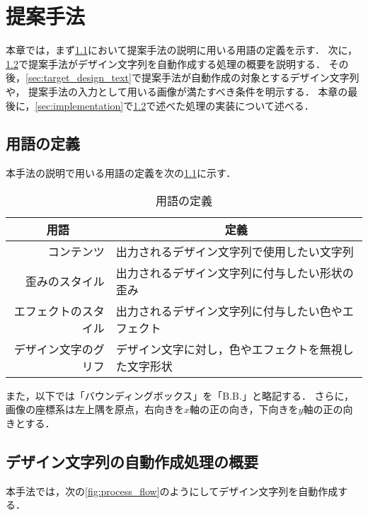 \documentclass[\homedir/main.tex]{subfiles}
\begin{document}
\setcounter{chapter}{3}
\chapter{提案手法}\label{chap:methods}
本章では，まず\cref{sec:terms_definition}において提案手法の説明に用いる用語の定義を示す．
次に，\cref{sec:process_flow}で提案手法がデザイン文字列を自動作成する処理の概要を説明する．
その後，\cref{sec:target_design_text}で提案手法が自動作成の対象とするデザイン文字列や，
提案手法の入力として用いる画像が満たすべき条件を明示する．
本章の最後に，\cref{sec:implementation}で\cref{sec:process_flow}で述べた処理の実装について述べる．

\section{用語の定義}\label{sec:terms_definition}
本手法の説明で用いる用語の定義を次の\cref{tab:terms_definition}に示す．

\begin{table}[h]
    \centering
    \caption{用語の定義}
    \begin{tabular}[t]{rl}
        \toprule
        \multicolumn{1}{c}{用語} & \multicolumn{1}{c}{定義}     \\
        \midrule
        コンテンツ                  & 出力されるデザイン文字列で使用したい文字列      \\
        歪みのスタイル                & 出力されるデザイン文字列に付与したい形状の歪み    \\
        エフェクトのスタイル             & 出力されるデザイン文字列に付与したい色やエフェクト  \\
        デザイン文字のグリフ             & デザイン文字に対し，色やエフェクトを無視した文字形状 \\
        \bottomrule
    \end{tabular}
    \label{tab:terms_definition}
\end{table}

また，以下では「バウンディングボックス」を「B.B.」と略記する．
さらに，画像の座標系は左上隅を原点，右向きを$x$軸の正の向き，下向きを$y$軸の正の向きとする．
\section{デザイン文字列の自動作成処理の概要}\label{sec:process_flow}
本手法では，次の\cref{fig:process_flow}のようにしてデザイン文字列を自動作成する．
\end{document}
